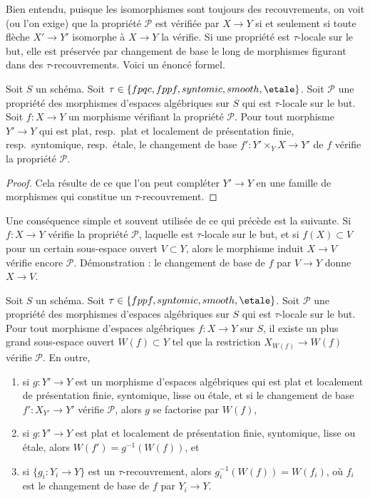 \noindent
Bien entendu, puisque les isomorphismes sont toujours des recouvrements,
on voit (ou l'on exige) que la propriété $\mathcal{P}$ est vérifiée par $X \to Y$
si et seulement si toute flèche $X' \to Y'$ isomorphe à $X \to Y$ la vérifie.
Si une propriété est $\tau$-locale sur le but, elle est préservée
par changement de base le long de morphismes figurant dans des $\tau$-recouvrements. Voici
un énoncé formel.

\begin{lemma}
\label{lemma-pullback-property-local-target}
Soit $S$ un schéma.
Soit $\tau \in \{fpqc, fppf, syntomic, smooth, \etale\}$.
Soit $\mathcal{P}$ une propriété des morphismes d'espaces algébriques sur $S$
qui est $\tau$-locale sur le but. Soit $f : X \to Y$ un morphisme vérifiant la propriété
$\mathcal{P}$. Pour tout morphisme $Y' \to Y$ qui est
plat, resp.\ plat et localement de présentation finie, resp.\ syntomique,
resp.\ \'etale, le changement de base
$f' : Y' \times_Y X \to Y'$ de $f$ vérifie la propriété $\mathcal{P}$.
\end{lemma}

\begin{proof}
Cela résulte de ce que l'on peut compléter $Y' \to Y$ en une famille de
morphismes qui constitue un $\tau$-recouvrement.
\end{proof}

\noindent
Une conséquence simple et souvent utilisée de ce qui précède est la suivante. Si
$f : X \to Y$ vérifie la propriété $\mathcal{P}$, laquelle est $\tau$-locale
sur le but, et si $f(X) \subset V$
pour un certain sous-espace ouvert $V \subset Y$, alors le morphisme induit
$X \to V$ vérifie encore $\mathcal{P}$. Démonstration : le changement de base de
$f$ par $V \to Y$ donne $X \to V$.

\begin{lemma}
\label{lemma-largest-open-of-the-base}
Soit $S$ un schéma.
Soit $\tau \in \{fppf, syntomic, smooth, \etale\}$.
Soit $\mathcal{P}$ une propriété des morphismes d'espaces algébriques sur $S$
qui est $\tau$-locale sur le but. Pour tout morphisme d'espaces algébriques
$f : X \to Y$ sur $S$, il existe un plus grand sous-espace ouvert
$W(f) \subset Y$ tel que la restriction $X_{W(f)} \to W(f)$ vérifie
$\mathcal{P}$. En outre,
\begin{enumerate}
\item si $g : Y' \to Y$ est un morphisme d'espaces algébriques qui est
plat et localement de présentation finie, syntomique, lisse ou \'etale,
et si le changement de base $f' : X_{Y'} \to Y'$ vérifie $\mathcal{P}$, alors
$g$ se factorise par $W(f)$,
\item si $g : Y' \to Y$ est plat et localement de présentation finie,
syntomique, lisse ou \'etale, alors $W(f') = g^{-1}(W(f))$, et
\item si $\{g_i : Y_i \to Y\}$ est un $\tau$-recouvrement, alors
$g_i^{-1}(W(f)) = W(f_i)$, où $f_i$ est le changement de base de $f$
par $Y_i \to Y$.
\end{enumerate}
\end{lemma}


